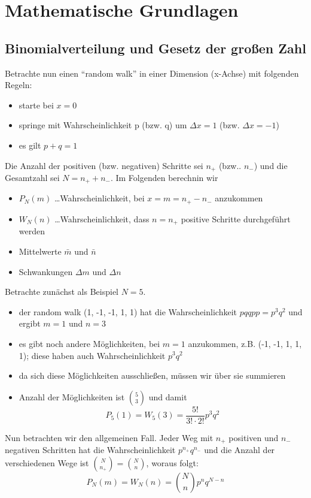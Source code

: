 \documentclass[ngerman]{scrartcl}
\begin{document}
	\section{Mathematische Grundlagen}
	
	\subsection{Binomialverteilung und Gesetz der großen Zahl}\label{sec:binom}
	
	
	Betrachte nun einen \enquote{random walk} in einer Dimension (x-Achse) mit folgenden Regeln:
	\begin{itemize}
		\item starte bei $x=0$
		\item springe mit Wahrscheinlichkeit p (bzw. q) um $\Delta x =1$ (bzw. $\Delta x = -1$)
		\item es gilt $p+q=1$
	\end{itemize}
	
	
	Die Anzahl der positiven (bzw. negativen) Schritte sei $n_+$ (bzw.. $n_-$) und die Gesamtzahl sei $N=n_+ + n_-$. Im Folgenden berechnin wir
	\begin{itemize}
		\item $P_N(m)$ \ldots Wahrscheinlichkeit, bei $x=m=n_+ - n_-$ anzukommen
		\item $W_N(n)$ \ldots Wahrscheinlichkeit, dass $n = n_+$ positive Schritte durchgeführt werden
		\item Mittelwerte $\bar{m}$ und $\bar{n}$
		\item Schwankungen $\Delta m$ und $\Delta n$
		
	\end{itemize}
	
	Betrachte zunächst als Beispiel $N=5$. 
	\begin{itemize}
		\item der random walk (1, -1, -1, 1, 1) hat die Wahrscheinlichkeit $pqqpp=p^3q^2$ und ergibt $m=1$ und $n=3$
		\item es gibt noch andere Möglichkeiten, bei $m=1$ anzukommen, z.B. (-1, -1, 1, 1, 1); diese haben auch Wahrscheinlichkeit $p^3q^2$
		\item da sich diese Möglichkeiten ausschließen, müssen wir über sie summieren
		\item Anzahl der Möglichkeiten ist $\binom{5}{3}$ und damit \[ P_5(1)=W_5(3)=\frac{5!}{3! \cdot 2!}p^3q^2 \]
	\end{itemize}
	
	Nun betrachten wir den allgemeinen Fall. Jeder Weg mit $n_+$ positiven und $n_-$ negativen Schritten hat die Wahrscheinlichkeit $p^{n_+}q^{n_-}$ und die Anzahl der verschiedenen Wege ist $\binom{N}{n_+} = \binom{N}{n}$, woraus folgt:
	\begin{equation}
		P_N(m)=W_N(n)=\binom{N}{n}p^n q^{N-n} \tag{Binomialverteilung}
	\end{equation}
	
\end{document}
